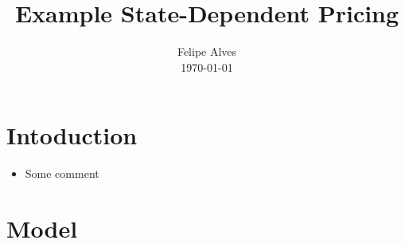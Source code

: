 \documentclass[a4paper,10pt]{article}  %
\title{ Example State-Dependent Pricing \vspace{-1.25em}} %
\author{
        \normalfont \normalsize Felipe Alves \\[-3pt]       \normalsize
        \today
}
\date{ \vspace{-3em} }
\begin{document}
\maketitle

\section{Intoduction} %
\label{sec:intoduction}
\begin{itemize}
   
   \item Some comment

\end{itemize}
\section{Model} %
\label{sec:model}
\end{document}
